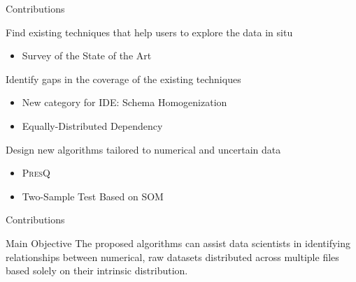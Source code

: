 \documentclass[10pt]{beamer}
\newcommand{\PresQ}[0]{\textsc{PresQ}\xspace}
\begin{document}
\begin{frame}{Contributions}

\begin{alertblock}{ Find existing techniques that help users to explore the data in situ}
    \begin{itemize}
        \item Survey of the State of the Art
    \end{itemize}
\end{alertblock}

\begin{alertblock}{ Identify gaps in the coverage of the existing techniques}
    \begin{itemize}
        \item New category for IDE: \alert{Schema Homogenization}
        \item Equally-Distributed Dependency
    \end{itemize}
\end{alertblock}

\begin{alertblock}{ Design new algorithms tailored to numerical and uncertain data}
    \begin{itemize}
        \item \PresQ
        \item Two-Sample Test Based on SOM
    \end{itemize}
\end{alertblock}

\end{frame}

\begin{frame}{Contributions}

\begin{block}{ Main Objective}
    The proposed algorithms can assist data scientists in identifying relationships
    between numerical, raw datasets distributed across multiple files
    based solely on their intrinsic distribution.
\end{block}

\end{frame}
\end{document}
